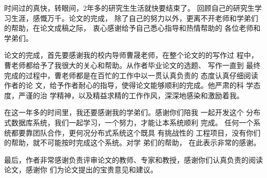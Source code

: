 时间过的真快，转眼间，2年多的研究生生活就快要结束了。
回顾自己的研究生学习生涯，感慨万千。论文的完成，
除了自己的努力以外，更离不开老师和学弟们的帮助，在论文成稿之际，
衷心感谢给予自己悉心指导和热情帮助的
各位老师和学弟们。 

论文的完成，首先要感谢我的校内导师曹晟老师，在整个论文的的写作过
程中，曹老师都给予了我很大的关心和帮助。从作者毕业论文的选题、
写作一直到
最终完成的过程中，曹老师都是在百忙的工作中以一贯认真负责的
态度认真仔细阅读
作者的论
文，给予作者耐心的指导，使得论文能够顺利的完成。他严肃的科
学态度，严谨的治
学精神，以及精益求精的工作作风，深深地感染和激励着我。

在这一年多的时间里，我还要感谢我的学弟们。感谢你们陪我
一起开发这个
分布式数据库系统，我们一起学习，一个努力，才能让本系统顺利
完成。
任何一个系统都要靠团队合作，更何况分布式系统这个既具
有挑战性的
工程项目，没有你们的帮助，就不可能按时完成这个系统。对学
弟们的帮助，
在此表示非常的感谢。

最后，作者非常感谢负责评审论文的教师、专家和教授，感谢你们认真负责的阅读论文，感谢你
们为论文提出的宝贵意见和建议。